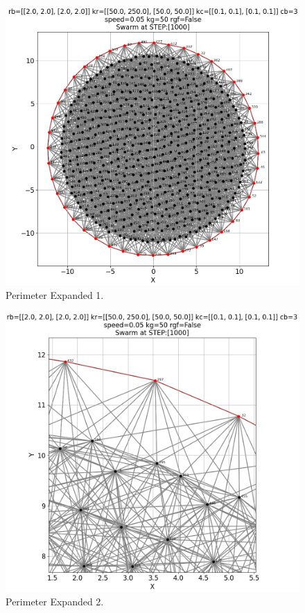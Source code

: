 \documentclass[12pt,a4paper]{IEEEtran}
\begin{document}
\begin{figure}[H]
	\begin{center}
		\includegraphics[width=1.0\linewidth]{figures/perimExpand1}
	\end{center}
	\caption{Perimeter Expanded 1. \label{fig:perimExpand1}}
\end{figure}

\begin{figure}[H]
	\begin{center}
		\includegraphics[width=1.0\linewidth]{figures/perimExpand2}
	\end{center}
	\caption{Perimeter Expanded 2. \label{fig:perimExpand2}}
\end{figure}
\end{document}
